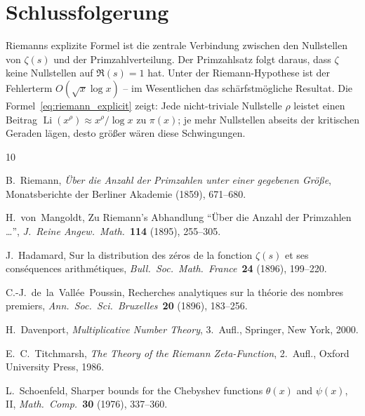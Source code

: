 \documentclass[12pt,a4paper]{amsart}
\theoremstyle{definition}
\DeclareMathOperator{\Li}{Li}
\begin{document}
\section{Schlussfolgerung}

Riemanns explizite Formel ist die zentrale Verbindung zwischen den
Nullstellen von $\zeta(s)$ und der Primzahlverteilung.
Der Primzahlsatz folgt daraus, dass $\zeta$ keine Nullstellen auf
$\Re(s)=1$ hat.
Unter der Riemann-Hypothese ist der Fehlerterm $O(\sqrt{x}\log x)$ --
im Wesentlichen das sch\"arfstm\"ogliche Resultat.
Die Formel~\eqref{eq:riemann_explicit} zeigt: Jede nicht-triviale Nullstelle
$\rho$ leistet einen Beitrag $\Li(x^\rho) \approx x^\rho/\log x$ zu $\pi(x)$;
je mehr Nullstellen abseits der kritischen Geraden l\"agen, desto gr\"o\ss er
w\"aren diese Schwingungen.

\begin{thebibliography}{10}

B.~Riemann,
\emph{\"Uber die Anzahl der Primzahlen unter einer gegebenen Gr\"o\ss e},
Monatsberichte der Berliner Akademie (1859), 671--680.

H.~von~Mangoldt,
Zu Riemann's Abhandlung ``\"Uber die Anzahl der Primzahlen \ldots'',
\emph{J.\ Reine Angew.\ Math.}\ \textbf{114} (1895), 255--305.

J.~Hadamard,
Sur la distribution des z\'eros de la fonction $\zeta(s)$ et ses
cons\'equences arithm\'etiques,
\emph{Bull.\ Soc.\ Math.\ France}\ \textbf{24} (1896), 199--220.

C.-J.\ de~la~Vall\'ee~Poussin,
Recherches analytiques sur la th\'eorie des nombres premiers,
\emph{Ann.\ Soc.\ Sci.\ Bruxelles}\ \textbf{20} (1896), 183--256.

H.~Davenport,
\emph{Multiplicative Number Theory}, 3.~Aufl.,
Springer, New York, 2000.

E.~C.~Titchmarsh,
\emph{The Theory of the Riemann Zeta-Function}, 2.~Aufl.,
Oxford University Press, 1986.

L.~Schoenfeld,
Sharper bounds for the Chebyshev functions $\theta(x)$ and $\psi(x)$, II,
\emph{Math.\ Comp.}\ \textbf{30} (1976), 337--360.

\end{thebibliography}
\end{document}
